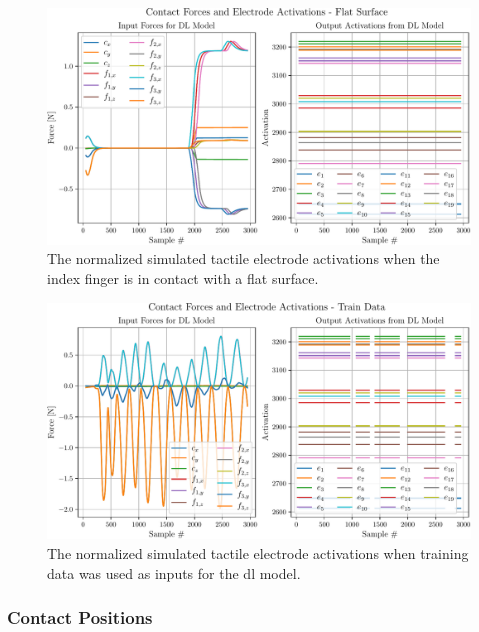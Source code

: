 \begin{figure}[!h]
	\begin{center}
		\includegraphics[width=\textwidth]{chapters/1-tactile-perception/fig/matplotlib/flat-contact-graph.pdf}
	\end{center}
	\caption{The normalized simulated tactile electrode activations when the index finger is in contact with a flat surface.}
	\label{fig:flat-contact-graph}
\end{figure}
\begin{figure}[!h]
	\begin{center}
		\includegraphics[width=\textwidth]{chapters/1-tactile-perception/fig/matplotlib/train-contact-graph.pdf}
	\end{center}
	\caption{The normalized simulated tactile electrode activations when training data was used as inputs for the \gls{dl} model.}
	\label{fig:train-contact-graph}
\end{figure}

\subsubsection{Contact Positions}

